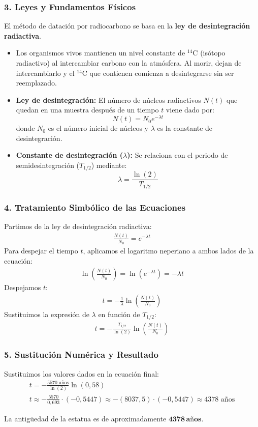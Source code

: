 \subsubsection*{3. Leyes y Fundamentos Físicos}
El método de datación por radiocarbono se basa en la \textbf{ley de desintegración radiactiva}.
\begin{itemize}
    \item Los organismos vivos mantienen un nivel constante de $^{14}\text{C}$ (isótopo radiactivo) al intercambiar carbono con la atmósfera. Al morir, dejan de intercambiarlo y el $^{14}\text{C}$ que contienen comienza a desintegrarse sin ser reemplazado.
    \item \textbf{Ley de desintegración:} El número de núcleos radiactivos $N(t)$ que quedan en una muestra después de un tiempo $t$ viene dado por:
    $$ N(t) = N_0 e^{-\lambda t} $$
    donde $N_0$ es el número inicial de núcleos y $\lambda$ es la constante de desintegración.
    \item \textbf{Constante de desintegración ($\lambda$):} Se relaciona con el periodo de semidesintegración ($T_{1/2}$) mediante:
    $$ \lambda = \frac{\ln(2)}{T_{1/2}} $$
\end{itemize}

\subsubsection*{4. Tratamiento Simbólico de las Ecuaciones}
Partimos de la ley de desintegración radiactiva:
\begin{gather}
    \frac{N(t)}{N_0} = e^{-\lambda t}
\end{gather}
Para despejar el tiempo $t$, aplicamos el logaritmo neperiano a ambos lados de la ecuación:
\begin{gather}
    \ln\left(\frac{N(t)}{N_0}\right) = \ln(e^{-\lambda t}) = -\lambda t
\end{gather}
Despejamos $t$:
\begin{gather}
    t = -\frac{1}{\lambda} \ln\left(\frac{N(t)}{N_0}\right)
\end{gather}
Sustituimos la expresión de $\lambda$ en función de $T_{1/2}$:
\begin{gather}
    t = -\frac{T_{1/2}}{\ln(2)} \ln\left(\frac{N(t)}{N_0}\right)
\end{gather}

\subsubsection*{5. Sustitución Numérica y Resultado}
Sustituimos los valores dados en la ecuación final:
\begin{gather}
    t = -\frac{5570 \text{ años}}{\ln(2)} \ln(0,58) \nonumber \\
    t \approx -\frac{5570}{0,693} \cdot (-0,5447) \approx - (8037,5) \cdot (-0,5447) \approx 4378 \text{ años}
\end{gather}
\begin{cajaresultado}
    La antigüedad de la estatua es de aproximadamente $\boldsymbol{4378 \, \textbf{años}}$.
\end{cajaresultado}

